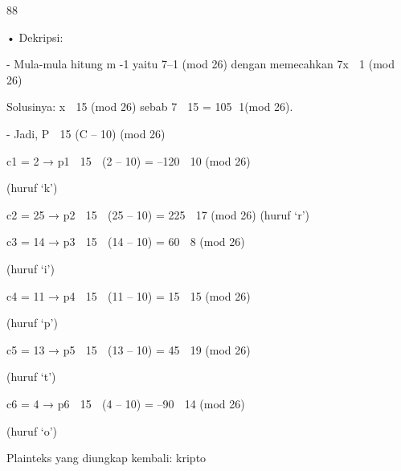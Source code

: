 \documentclass{article}
\begin{document}

88

• Dekripsi:

 - Mula-mula hitung m -1 yaitu 7–1 (mod 26) dengan memecahkan 7x  1 (mod 26)

   Solusinya: x  15 (mod 26) sebab 7  15 = 105 1(mod 26).

 -  Jadi, P  15 (C – 10) (mod 26) 

 c1 = 2    → p1  15  (2 – 10) = –120  10 (mod 26) 

(huruf ‘k’)

 c2 = 25  → p2  15  (25 – 10) = 225  17 (mod 26) (huruf ‘r’)

 c3 = 14  → p3  15  (14 – 10) = 60  8 (mod 26) 

(huruf ‘i’)

 c4 = 11  → p4  15  (11 – 10) = 15  15 (mod 26) 

(huruf ‘p’)

 c5 = 13  → p5  15  (13 – 10) = 45  19 (mod 26) 

(huruf ‘t’)

 c6 = 4    → p6  15  (4 – 10) = –90   14 (mod 26) 

(huruf ‘o’)


 Plainteks yang diungkap kembali:  kripto
\end{document}
